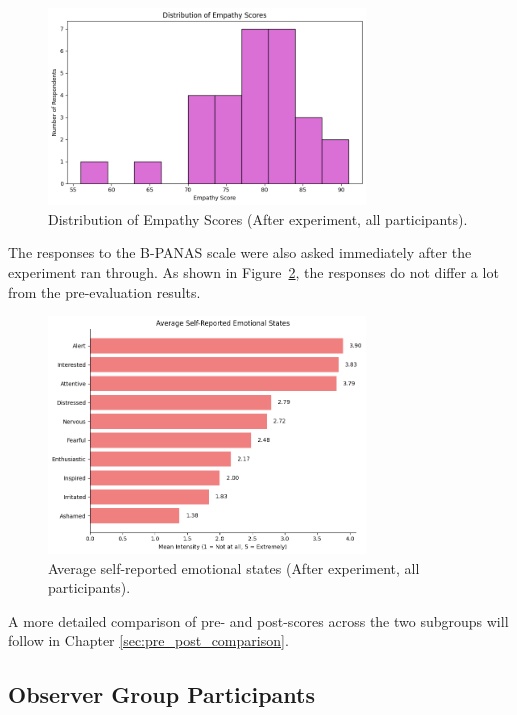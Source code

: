 \begin{figure}[H]
\centering
\includegraphics[width=0.75\textwidth]{../../Figures/empathy_scores_post_all.png}
\caption{Distribution of Empathy Scores (After experiment, all participants).}
\label{fig:empathy_scores_post_all}
\end{figure}

\vspace{1em}

The responses to the B-PANAS scale were also asked immediately after the experiment ran through. As shown in Figure~\ref{fig:emotional_post_all}, the responses do not differ a lot from the pre-evaluation results. 

\begin{figure}[htbp]
    \centering
    \includegraphics[width=0.75\textwidth]{../../Figures/emotional-post-all.png}
    \caption{Average self-reported emotional states (After experiment, all participants).}
    \label{fig:emotional_post_all}
\end{figure}

A more detailed comparison of pre- and post-scores across the two subgroups will follow in Chapter \ref{sec:pre_post_comparison}.

\subsection{Observer Group Participants}

